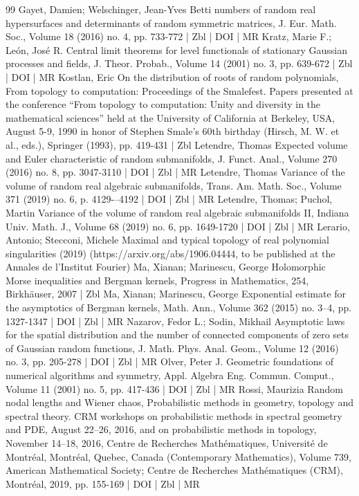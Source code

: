 \begin{thebibliography}{99}
Gayet, Damien; Welschinger, Jean-Yves Betti numbers of random real hypersurfaces and determinants of random symmetric matrices, J. Eur. Math. Soc., Volume 18 (2016) no. 4, pp. 733-772 | Zbl | DOI | MR
Kratz, Marie F.; León, José R. Central limit theorems for level functionals of stationary Gaussian processes and fields, J. Theor. Probab., Volume 14 (2001) no. 3, pp. 639-672 | Zbl | DOI | MR
Kostlan, Eric On the distribution of roots of random polynomials, From topology to computation: Proceedings of the Smalefest. Papers presented at the conference “From topology to computation: Unity and diversity in the mathematical sciences” held at the University of California at Berkeley, USA, August 5-9, 1990 in honor of Stephen Smale’s 60th birthday (Hirsch, M. W. et al., eds.), Springer (1993), pp. 419-431 | Zbl
Letendre, Thomas Expected volume and Euler characteristic of random submanifolds, J. Funct. Anal., Volume 270 (2016) no. 8, pp. 3047-3110 | DOI | Zbl | MR
Letendre, Thomas Variance of the volume of random real algebraic submanifolds, Trans. Am. Math. Soc., Volume 371 (2019) no. 6, p. 4129-–4192 | DOI | Zbl | MR
Letendre, Thomas; Puchol, Martin Variance of the volume of random real algebraic submanifolds II, Indiana Univ. Math. J., Volume 68 (2019) no. 6, pp. 1649-1720 | DOI | Zbl | MR
Lerario, Antonio; Stecconi, Michele Maximal and typical topology of real polynomial singularities (2019) (https://arxiv.org/abs/1906.04444, to be published at the Annales de l’Institut Fourier)
Ma, Xianan; Marinescu, George Holomorphic Morse inequalities and Bergman kernels, Progress in Mathematics, 254, Birkhäuser, 2007 | Zbl
Ma, Xianan; Marinescu, George Exponential estimate for the asymptotics of Bergman kernels, Math. Ann., Volume 362 (2015) no. 3–4, pp. 1327-1347 | DOI | Zbl | MR
Nazarov, Fedor L.; Sodin, Mikhail Asymptotic laws for the spatial distribution and the number of connected components of zero sets of Gaussian random functions, J. Math. Phys. Anal. Geom., Volume 12 (2016) no. 3, pp. 205-278 | DOI | Zbl | MR
Olver, Peter J. Geometric foundations of numerical algorithms and symmetry, Appl. Algebra Eng. Commun. Comput., Volume 11 (2001) no. 5, pp. 417-436 | DOI | Zbl | MR
Rossi, Maurizia Random nodal lengths and Wiener chaos, Probabilistic methods in geometry, topology and spectral theory. CRM workshops on probabilistic methods in spectral geometry and PDE, August 22–26, 2016, and on probabilistic methods in topology, November 14–18, 2016, Centre de Recherches Mathématiques, Université de Montréal, Montréal, Quebec, Canada (Contemporary Mathematics), Volume 739, American Mathematical Society; Centre de Recherches Mathématiques (CRM), Montréal, 2019, pp. 155-169 | DOI | Zbl | MR

\end{thebibliography}
